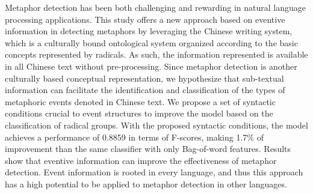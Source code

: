 Metaphor detection has been both challenging and rewarding in natural language processing applications. This study offers a new approach based on eventive information in detecting metaphors by leveraging the Chinese writing system, which is a culturally bound ontological system organized according to the basic concepts represented by radicals. As such, the information represented is available in all Chinese text without pre-processing. Since metaphor detection is another culturally based conceptual representation, we hypothesize that sub-textual information can facilitate the identification and classification of the types of metaphoric events denoted in Chinese text. We propose a set of syntactic conditions crucial to event structures to improve the model based on the classification of radical groups. With the proposed syntactic conditions, the model achieves a performance of 0.8859 in terms of F-scores, making 1.7\% of improvement than the same classifier with only Bag-of-word features. Results show that eventive information can improve the effectiveness of metaphor detection. Event information is rooted in every language, and thus this approach has a high potential to be applied to metaphor detection in other languages.
